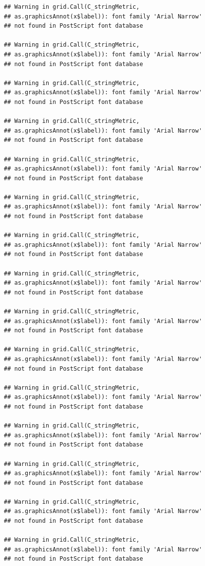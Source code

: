 \documentclass[]{krantz}
\begin{document}
\begin{verbatim}
## Warning in grid.Call(C_stringMetric,
## as.graphicsAnnot(x$label)): font family 'Arial Narrow'
## not found in PostScript font database

## Warning in grid.Call(C_stringMetric,
## as.graphicsAnnot(x$label)): font family 'Arial Narrow'
## not found in PostScript font database

## Warning in grid.Call(C_stringMetric,
## as.graphicsAnnot(x$label)): font family 'Arial Narrow'
## not found in PostScript font database

## Warning in grid.Call(C_stringMetric,
## as.graphicsAnnot(x$label)): font family 'Arial Narrow'
## not found in PostScript font database

## Warning in grid.Call(C_stringMetric,
## as.graphicsAnnot(x$label)): font family 'Arial Narrow'
## not found in PostScript font database

## Warning in grid.Call(C_stringMetric,
## as.graphicsAnnot(x$label)): font family 'Arial Narrow'
## not found in PostScript font database

## Warning in grid.Call(C_stringMetric,
## as.graphicsAnnot(x$label)): font family 'Arial Narrow'
## not found in PostScript font database

## Warning in grid.Call(C_stringMetric,
## as.graphicsAnnot(x$label)): font family 'Arial Narrow'
## not found in PostScript font database

## Warning in grid.Call(C_stringMetric,
## as.graphicsAnnot(x$label)): font family 'Arial Narrow'
## not found in PostScript font database

## Warning in grid.Call(C_stringMetric,
## as.graphicsAnnot(x$label)): font family 'Arial Narrow'
## not found in PostScript font database

## Warning in grid.Call(C_stringMetric,
## as.graphicsAnnot(x$label)): font family 'Arial Narrow'
## not found in PostScript font database

## Warning in grid.Call(C_stringMetric,
## as.graphicsAnnot(x$label)): font family 'Arial Narrow'
## not found in PostScript font database

## Warning in grid.Call(C_stringMetric,
## as.graphicsAnnot(x$label)): font family 'Arial Narrow'
## not found in PostScript font database

## Warning in grid.Call(C_stringMetric,
## as.graphicsAnnot(x$label)): font family 'Arial Narrow'
## not found in PostScript font database

## Warning in grid.Call(C_stringMetric,
## as.graphicsAnnot(x$label)): font family 'Arial Narrow'
## not found in PostScript font database


\end{verbatim}
\end{document}
